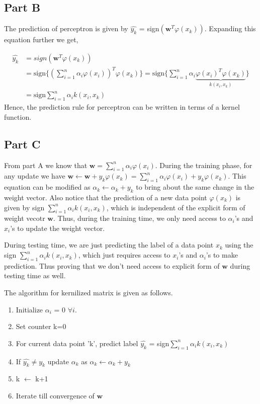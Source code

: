 \documentclass[11pt]{article}
\begin{document}
\newpage
\subsection{Part B}
The prediction of perceptron is given by $\hat{y_k}$ = sign$(\boldsymbol{w}^T\varphi(x_k))$. Expanding this equation further we get,

\begin{equation*}
	\begin{split}
		\hat{y_k} & = sign(\boldsymbol{w}^T\varphi(x_k))\\
				  & = \text{sign}\{(\sum_{i=1}^{n}\alpha_i\varphi(x_i))^T\varphi(x_k)\} = \text{sign}\{\sum_{i=1}^{n}\alpha_i\underbrace{\varphi(x_i)^T\varphi(x_k)}_{k(x_i,x_k)}\} \\
				  & = \text{sign}\sum_{i=1}^{n}\alpha_ik(x_i,x_k)
	\end{split}
\end{equation*}
Hence, the prediction rule for perceptron can be written in terms of a kernel function.
\subsection{Part C}
From part A we know that $\boldsymbol{w} = \sum_{i=1}^{n}\alpha_i\varphi(x_i)$. During the training phase, for any update we have $\boldsymbol{w} \leftarrow \boldsymbol{w}+y_k\varphi(x_k) = \sum_{i=1}^{n}\alpha_i\varphi(x_i) + y_k\varphi(x_k)$. This equation can be modified as $\alpha_k \leftarrow \alpha_k + y_k$ to bring about the same change in the weight vector. Also notice that the prediction of a new data point $\varphi(x_k)$ is given by sign $\sum_{i=1}^{n}\alpha_ik(x_i,x_k)$, which is independent of the explicit form of weight vecotr $\boldsymbol{w}$. Thus, during the training time, we only need access to $\alpha_i$'s and $x_i$'s to update the weight vector.

During testing time, we are just predicting the label of a data point $x_k$ using the sign $\sum_{i=1}^{n}\alpha_ik(x_i,x_k)$, which just requires access to $x_i$'s and $\alpha_i$'s to make prediction. Thus proving that we don't need access to explicit form of $\boldsymbol{w}$ during testing time as well.

The algorithm for kernilized matrix is given as follows.
\begin{enumerate}
	\item Initialize $\alpha_i$ = 0 $\forall i$.
	\item Set counter k=0
	\item For current data point 'k', predict label $\hat{y_k}$ = sign$\sum_{i=1}^{n}\alpha_ik(x_i,x_k)$
	\item If $\hat{y_k} \not= y_k$ update $\alpha_k$ as $\alpha_k \leftarrow \alpha_k + y_k$
	\item k $\leftarrow$ k+1
	\item Iterate till convergence of $\boldsymbol{w}$
\end{enumerate}
\end{document}
